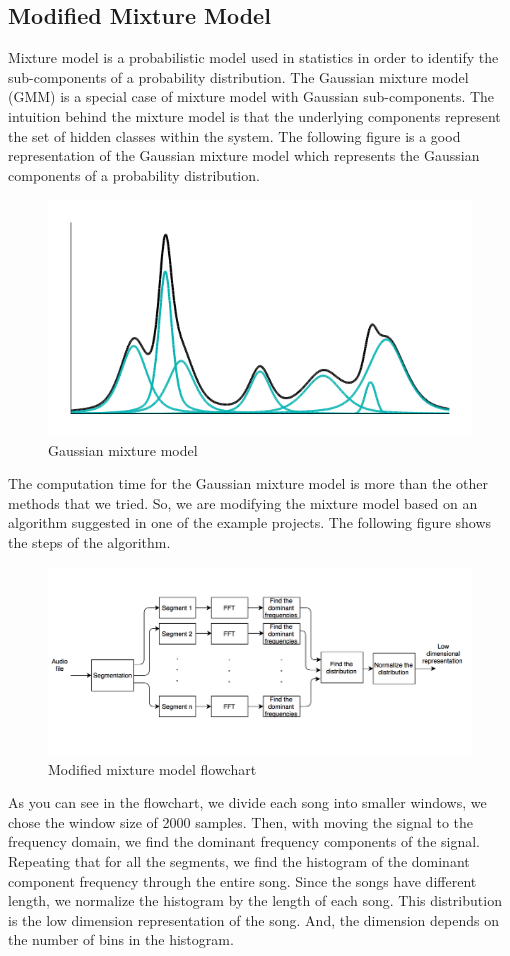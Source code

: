 \documentclass[12pt]{article}
\begin{document}
\subsection{Modified Mixture Model}
Mixture model is a probabilistic model used in statistics in order to identify the sub-components of a probability distribution. The Gaussian mixture model (GMM) is a special case of mixture model with Gaussian sub-components. The intuition behind the mixture model is that the underlying components represent the set of hidden classes within the system. The following figure is a good representation of the Gaussian mixture model which represents the Gaussian components of a probability distribution.
\begin{figure}[H]\label{GMM}
	\centering
	\includegraphics[width=1\linewidth]{GMM.png}
	\caption{Gaussian mixture model}
\end{figure}
The computation time for the Gaussian mixture model is more than the other methods that we tried. So, we are modifying the mixture model based on an algorithm suggested in one of the example projects. The following figure shows the steps of the algorithm.
\begin{figure}[H]\label{fch}
	\centering
	\includegraphics[width=1.1\linewidth]{fch.png}
	\caption{Modified mixture model flowchart}
\end{figure} 
As you can see in the flowchart, we divide each song into smaller windows, we chose the window size of 2000 samples. Then, with moving the signal to the frequency domain, we find the dominant frequency components of the signal. Repeating that for all the segments, we find the histogram of the dominant component frequency through the entire song. Since the songs have different length, we normalize the histogram by the length of each song. This distribution is the low dimension representation of the song. And, the dimension depends on the number of bins in the histogram.
\end{document}
